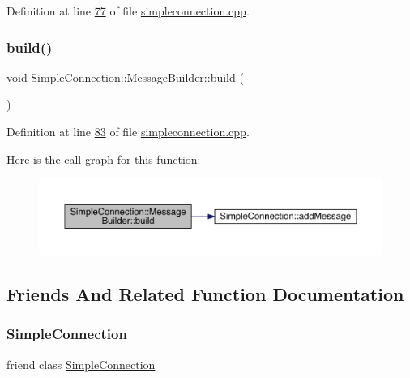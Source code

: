 Definition at line \hyperlink{a00005_source_l00077}{77} of file \hyperlink{a00005_source}{simpleconnection.\+cpp}.

\mbox{\label{a00129_ac39d9787cbea1c6d81a7cdbc736c9061}} 
\subsubsection{\texorpdfstring{build()}{build()}}
{\footnotesize\ttfamily void Simple\+Connection\+::\+Message\+Builder\+::build (\begin{DoxyParamCaption}{ }\end{DoxyParamCaption})}



Definition at line \hyperlink{a00005_source_l00083}{83} of file \hyperlink{a00005_source}{simpleconnection.\+cpp}.

Here is the call graph for this function\+:
\nopagebreak
\begin{figure}[H]
\begin{center}
\leavevmode
\includegraphics[width=350pt]{d9/d47/a00129_ac39d9787cbea1c6d81a7cdbc736c9061_cgraph}
\end{center}
\end{figure}


\subsection{Friends And Related Function Documentation}
\mbox{\label{a00129_a7539cf9ee12d3fa81d3d8702d8646c89}} 
\subsubsection{\texorpdfstring{Simple\+Connection}{SimpleConnection}}
{\footnotesize\ttfamily friend class \hyperlink{a00125}{Simple\+Connection}\hspace{0.3cm}{\ttfamily [friend]}}



